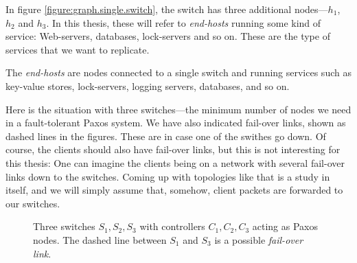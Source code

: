 In figure \vref{figure:graph.single.switch}, the switch has three additional
nodes---$h_1$, $h_2$ and $h_3$.  In this thesis, these will refer to
\textit{end-hosts} running some kind of service: Web-servers, databases,
lock-servers and so on.  These are the type of services that we want to
replicate.


The \textit{end-hosts} are nodes connected to a single
switch and running services such as key-value stores,
lock-servers, logging servers,
databases, and so on.

Here is the situation with three switches---the minimum number of nodes we
need in a fault-tolerant Paxos system.  We have also indicated fail-over
links, shown as dashed lines in the figures.  These are in case one of the
swithes go down.  Of course, the clients should also have fail-over links,
but this is not interesting for this thesis: One can imagine the clients
being on a network with several fail-over links down to the switches.
Coming up with topologies like that is a study in itself, and we will simply
assume that, somehow, client packets are forwarded to our switches.

\begin{figure}[H]
  \centering
  \caption{Three switches $S_1, S_2, S_3$ with controllers $C_1, C_2, C_3$ acting as Paxos nodes.
           The dashed line between $S_1$ and $S_3$ is a possible \textit{fail-over link}.}
  \label{figure:graph.three.switches}
\end{figure}

